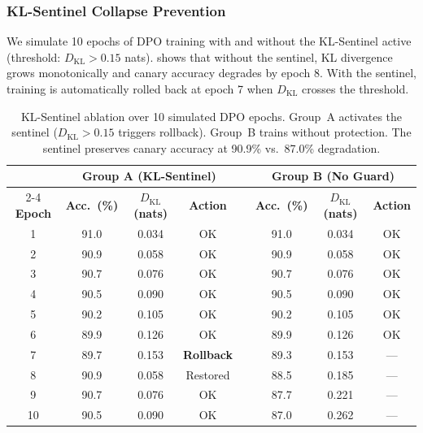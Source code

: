 \documentclass[11pt,a4paper]{article}
\begin{document}
\subsubsection{KL-Sentinel Collapse Prevention}

We simulate 10 epochs of DPO training with and without the KL-Sentinel active (threshold: $D_{\text{KL}} > 0.15$ nats).  shows that without the sentinel, KL divergence grows monotonically and canary accuracy degrades by epoch 8. With the sentinel, training is automatically rolled back at epoch 7 when $D_{\text{KL}}$ crosses the threshold.

\begin{table}[ht]
\centering
\caption{KL-Sentinel ablation over 10 simulated DPO epochs. Group~A activates the sentinel ($D_{\text{KL}} > 0.15$ triggers rollback). Group~B trains without protection. The sentinel preserves canary accuracy at 90.9\% vs.\ 87.0\% degradation.}
\label{tab:kl}
\begin{tabular}{@{}cccccccc@{}}
\toprule
& \multicolumn{3}{c}{\textbf{Group A (KL-Sentinel)}} & & \multicolumn{3}{c}{\textbf{Group B (No Guard)}} \\
\cmidrule{2-4} \cmidrule{6-8}
\textbf{Epoch} & \textbf{Acc.\ (\%)} & $D_{\text{KL}}$ \textbf{(nats)} & \textbf{Action} & & \textbf{Acc.\ (\%)} & $D_{\text{KL}}$ \textbf{(nats)} & \textbf{Action} \\
\midrule
1  & 91.0 & 0.034 & OK       & & 91.0 & 0.034 & OK \\
2  & 90.9 & 0.058 & OK       & & 90.9 & 0.058 & OK \\
3  & 90.7 & 0.076 & OK       & & 90.7 & 0.076 & OK \\
4  & 90.5 & 0.090 & OK       & & 90.5 & 0.090 & OK \\
5  & 90.2 & 0.105 & OK       & & 90.2 & 0.105 & OK \\
6  & 89.9 & 0.126 & OK       & & 89.9 & 0.126 & OK \\
7  & 89.7 & 0.153 & \textbf{Rollback} & & 89.3 & 0.153 & --- \\
8  & 90.9 & 0.058 & Restored & & 88.5 & 0.185 & --- \\
9  & 90.7 & 0.076 & OK       & & 87.7 & 0.221 & --- \\
10 & 90.5 & 0.090 & OK       & & 87.0 & 0.262 & --- \\
\bottomrule
\end{tabular}
\end{table}

\end{document}
